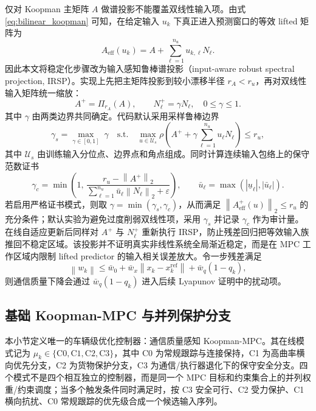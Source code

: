 \documentclass[twocolumn,3p,times,procedia]{elsarticle}
\newcommand{\norm}[1]{\left\lVert #1 \right\rVert}
\begin{document}
仅对 Koopman 主矩阵 $A$ 做谱投影不能覆盖双线性输入项。由式 \eqref{eq:bilinear_koopman} 可知，在给定输入 $u_k$ 下真正进入预测窗口的等效 lifted 矩阵为
\begin{equation}
A_{\mathrm{eff}}(u_k)=A+\sum_{\ell=1}^{n_u}u_{k,\ell}N_\ell .
\label{eq:effective_bilinear_matrix}
\end{equation}
因此本文将稳定化步骤改为输入感知鲁棒谱投影（input-aware robust spectral projection, IRSP）。实现上先把主矩阵投影到较小漂移半径 $r_A<r_u$，再对双线性输入矩阵统一缩放：
\begin{equation}
A^+=\Pi_{r_A}(A),\qquad N_\ell^+=\gamma N_\ell,\quad 0\le\gamma\le 1 .
\label{eq:irsp_projection}
\end{equation}
其中 $\gamma$ 由两类边界共同确定。代码默认采用采样鲁棒边界
\begin{equation}
\gamma_s=\max_{\gamma\in[0,1]}\;\gamma
\quad \mathrm{s.t.}\quad
\max_{u\in\mathcal U_s}
\rho\!\left(A^++\gamma\sum_{\ell=1}^{n_u}u_\ell N_\ell\right)
\le r_u ,
\label{eq:sampled_irsp}
\end{equation}
其中 $\mathcal U_s$ 由训练输入分位点、边界点和角点组成。同时计算连续输入包络上的保守范数证书
\begin{equation}
\gamma_c=\min\left(1,\,
\frac{r_u-\norm{A^+}_2}{\sum_{\ell=1}^{n_u}\bar u_\ell\norm{N_\ell}_2+\varepsilon}
\right),\qquad
\bar u_\ell=\max(|\underline u_\ell|,|\bar u_\ell|).
\label{eq:norm_irsp_certificate}
\end{equation}
若启用严格证书模式，则取 $\gamma=\min(\gamma_s,\gamma_c)$，从而满足 $\norm{A_{\mathrm{eff}}^+(u)}_2\le r_u$ 的充分条件；默认实验为避免过度削弱双线性项，采用 $\gamma_s$ 并记录 $\gamma_c$ 作为审计量。在线自适应更新后同样对 $A^+$ 与 $N_\ell^+$ 重新执行 IRSP，防止残差回归把等效输入族推回不稳定区域。该投影并不证明真实非线性系统全局渐近稳定，而是在 MPC 工作区域内限制 lifted predictor 的输入相关误差放大。令一步残差满足
\begin{equation}
\norm{w_k}\le \bar w_0+\bar w_x\norm{x_k-x_k^\mathrm{ref}}+\bar w_q(1-q_k),
\label{eq:residual_bound}
\end{equation}
则通信质量下降会通过 $\bar w_q(1-q_k)$ 进入后续 Lyapunov 证明中的扰动项。

\subsection{基础 Koopman-MPC 与并列保护分支}

本小节定义唯一的车辆级优化控制器：通信质量感知 Koopman-MPC。其在线模式记为 $\mu_k\in\{\mathrm{C0},\mathrm{C1},\mathrm{C2},\mathrm{C3}\}$，其中 C0 为常规跟踪与连接保持，C1 为高曲率横向优先分支，C2 为货物保护分支，C3 为通信/执行器退化下的保守安全分支。四个模式不是四个相互独立的控制器，而是同一个 MPC 目标和约束集合上的并列权重/约束调度；当多个触发条件同时满足时，按 C3 安全可行、C2 受力保护、C1 横向抗扰、C0 常规跟踪的优先级合成一个候选输入序列。
\end{document}
